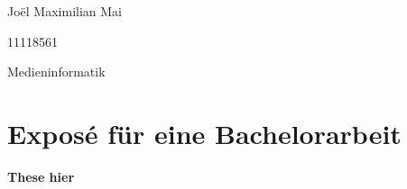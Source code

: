 \begin{titlepage}
Joël Maximilian Mai 
\vspace{0.1cm}

11118561 
\vspace{0.1cm}

Medieninformatik 
\vspace{2cm}

\section*{Exposé für eine Bachelorarbeit}
\vspace{0.4cm}

\begin{LARGE}
\textbf{These hier} 	
\end{LARGE}

\vspace{2cm}
\tableofcontents

\end{titlepage}
